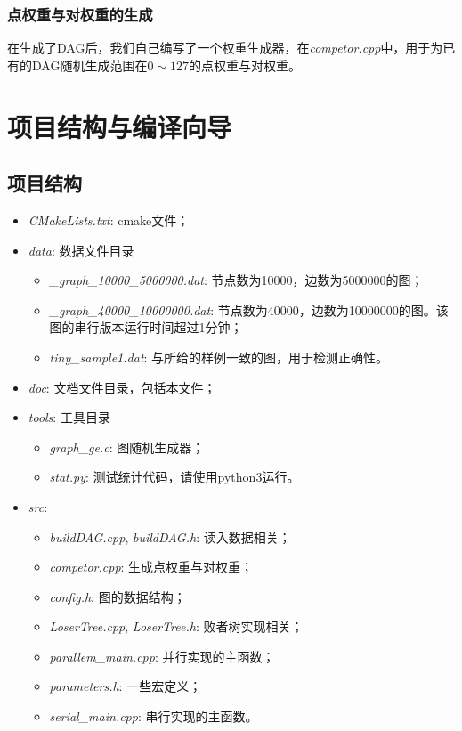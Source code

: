 \documentclass{article}
\begin{document}
	\subsubsection{点权重与对权重的生成}
	在生成了DAG后，我们自己编写了一个权重生成器，在\emph{competor.cpp}中，用于为已有的DAG随机生成范围在$0\sim 127$的点权重与对权重。
	
	\section{项目结构与编译向导}
	\subsection{项目结构}
	\begin{itemize}
		\item \emph{CMakeLists.txt}: cmake文件；
		\item \emph{data}: 数据文件目录
		\begin{itemize}
			\item \emph{\_graph\_10000\_5000000.dat}: 节点数为10000，边数为5000000的图；
			\item \emph{\_graph\_40000\_10000000.dat}: 节点数为40000，边数为10000000的图。该图的串行版本运行时间超过1分钟；
			\item \emph{tiny\_sample1.dat}: 与所给的样例一致的图，用于检测正确性。
		\end{itemize}
		\item \emph{doc}: 文档文件目录，包括本文件；
		\item \emph{tools}: 工具目录
		\begin{itemize}
			\item \emph{graph\_ge.c}: 图随机生成器；
			\item \emph{stat.py}: 测试统计代码，请使用python3运行。
		\end{itemize}
		\item \emph{src}:
		\begin{itemize}
			\item \emph{buildDAG.cpp}, \emph{buildDAG.h}: 读入数据相关；
			\item \emph{competor.cpp}: 生成点权重与对权重；
			\item \emph{config.h}: 图的数据结构；
			\item \emph{LoserTree.cpp}, \emph{LoserTree.h}: 败者树实现相关；
			\item \emph{parallem\_main.cpp}: 并行实现的主函数；
			\item \emph{parameters.h}: 一些宏定义；
			\item \emph{serial\_main.cpp}: 串行实现的主函数。
		\end{itemize}
	\end{itemize}
	
\end{document}
